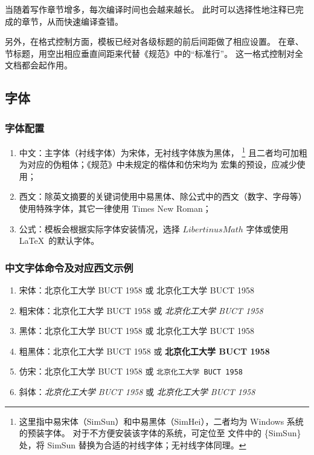 当随着写作章节增多，每次编译时间也会越来越长。
此时可以选择性地注释已完成的章节，从而快速编译查错。

另外，在格式控制方面，模板已经对各级标题的前后间距做了相应设置。
在章、节标题，用空出相应垂直间距来代替《规范》中的“标准行”。
这一格式控制对全文档都会起作用。
\subsection{字体}
\subsubsection{字体配置}
\begin{enumerate}
	\item 中文：主字体（衬线字体）为宋体，无衬线字体族为黑体，%
	\footnote{这里指中易宋体（SimSun）和中易黑体（SimHei），二者均为 Windows 系统的预装字体。
	对于不方便安装该字体的系统，可定位至 
	文件中的 \{SimSun\} 处，将 SimSun 替换为合适的衬线字体；无衬线字体同理。}
	且二者均可加粗为对应的伪粗体；《规范》中未规定的楷体和仿宋均为  宏集的预设，应减少使用；
	\item 西文：除英文摘要的关键词使用中易黑体、除公式中的西文（数字、字母等）使用特殊字体，其它一律使用 Times New Roman；
	\item 公式：模板会根据实际字体安装情况，选择 $LibertinusMath$ 字体或使用 \LaTeX\ 的默认字体。
\end{enumerate}

\subsubsection{中文字体命令及对应西文示例}
\begin{enumerate}
	\item 宋体：北京化工大学 BUCT 1958 或 \textrm{北京化工大学 BUCT 1958}
	\item 粗宋体：{\bfsong 北京化工大学 BUCT 1958} 或 \emph{北京化工大学 BUCT 1958}
	\item 黑体：{\heiti 北京化工大学 BUCT 1958} 或 \textsf{北京化工大学 BUCT 1958}
	\item 粗黑体：{\bfhei 北京化工大学 BUCT 1958} 或 \textsf{\bfseries 北京化工大学 BUCT 1958}
	\item 仿宋：{\ttfamily 北京化工大学 BUCT 1958} 或 \texttt{北京化工大学 BUCT 1958}
	\item 斜体：{\itshape 北京化工大学 BUCT 1958} 或 \textit{北京化工大学 BUCT 1958}
\end{enumerate}

